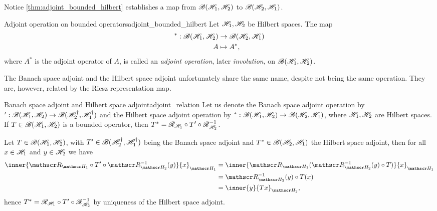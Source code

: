 Notice \cref{thm:adjoint_bounded_hilbert} establishes a map from \(\mathscr{B}(\mathscr{H}_1, \mathscr{H}_2)\) to \(\mathscr{B}(\mathscr{H}_2, \mathscr{H}_1)\).
\begin{definition}{Adjoint operation on bounded operators}{adjoint_bounded_hilbert}
    Let \(\mathscr{H}_1, \mathscr{H}_2\) be Hilbert spaces. The map
    \begin{align*}
        ^* : \mathscr{B}(\mathscr{H}_1, \mathscr{H}_2) &\to \mathscr{B}(\mathscr{H}_2, \mathscr{H}_1)\\
                                           A &\mapsto A^*,
    \end{align*}
    where \(A^*\) is the adjoint operator of \(A\), is called an \emph{adjoint operation}, later \emph{involution}, on \(\mathscr{B}(\mathscr{H}_1, \mathscr{H}_2)\).
\end{definition}
The Banach space adjoint and the Hilbert space adjoint unfortunately share the same name, despite not being the same operation. They are, however, related by the Riesz representation map.

\begin{proposition}{Banach space adjoint and Hilbert space adjoint}{adjoint_relation}
    Let us denote the Banach space adjoint operation by \(' : \mathscr{B}(\mathscr{H}_1, \mathscr{H}_2) \to \mathscr{B}(\mathscr{H}_2^\dag, \mathscr{H}_1^\dag)\) and the Hilbert space adjoint operation by \(^* : \mathscr{B}(\mathscr{H}_1, \mathscr{H}_2) \to \mathscr{B}(\mathscr{H}_2, \mathscr{H}_1)\), where \(\mathscr{H}_1, \mathscr{H}_2\) are Hilbert spaces. If \(T \in \mathscr{B}(\mathscr{H}_1, \mathscr{H}_2)\) is a bounded operator, then \(T^* = \mathscr{R}_{\mathscr{H}_1} \circ T' \circ \mathscr{R}^{-1}_{\mathscr{H}_2}\).
\end{proposition}
Let \(T \in \mathscr{B}(\mathscr{H}_1, \mathscr{H}_2)\), with \(T' \in \mathscr{B}(\mathscr{H}_2^\dag, \mathscr{H}_1^\dag)\) being the Banach space adjoint and \(T^* \in \mathscr{B}(\mathscr{H}_2, \mathscr{H}_1)\) the Hilbert space adjoint, then for all \(x \in \mathscr{H}_1\) and \(y \in \mathscr{H}_2\) we have
    \begin{align*}
        \inner{\riesz_{\hilbert_1} \circ T' \circ \riesz_{\hilbert_2}^{-1}(y)}{x}_{\hilbert_1}
        &= \inner{\riesz_{\hilbert_1}(\riesz_{\hilbert_2}^{-1}(y) \circ T)}{x}_{\hilbert_1}\\
        &= \riesz_{\hilbert_2}^{-1}(y) \circ T(x)\\
        &= \inner{y}{Tx}_{\hilbert_2},
    \end{align*}
    hence \(T^* = \mathscr{R}_{\mathscr{H}_1} \circ T' \circ \mathscr{R}^{-1}_{\mathscr{H}_2}\) by uniqueness of the Hilbert space adjoint.

